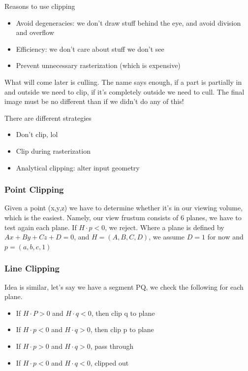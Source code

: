 \documentclass[11pt]{article}
\begin{document}
Reasons to use clipping
\begin{itemize}
    \item Avoid degeneracies: we don't draw stuff behind the eye, and avoid division and overflow
    \item Efficiency: we don't care about stuff we don't see
    \item Prevent unnecessary rasterization (which is expensive)
\end{itemize}

What will come later is culling. The name says enough, if a part is partially in and outside we need to clip, if it's completely outside we need to cull. The final image must be no different than if we didn't do any of this!

There are different strategies
\begin{itemize}
    \item Don't clip, lol
    \item Clip during rasterization
    \item Analytical clipping: alter input geometry
\end{itemize}

\subsubsection*{Point Clipping}
Given a point (x,y,z) we have to determine whether it's in our viewing volume, which is the easiest.
Namely, our view frustum consists of 6 planes, we have to test again each plane. If $H\cdot p < 0$, we reject. Where a plane is defined by $Ax + By + Cz +D  = 0 $, and $H = (A,B,C,D)$, we assume $D = 1$ for now and $p = (a,b,c,1)$   

\subsubsection*{Line Clipping}
Idea is similar, let's say we have a segment PQ, we check the following for each plane.

\begin{itemize}
    \item If $H\cdot P > 0$ and $ H\cdot q < 0$, then clip q to plane
    \item If $H\cdot p < 0$ and $H \cdot q > 0$, then clip p to plane
    \item If $H\cdot p > 0$ and $H \cdot q > 0$, pass through
    \item If $H\cdot p < 0$ and $H \cdot q < 0$, clipped out         
\end{itemize}
\end{document}
